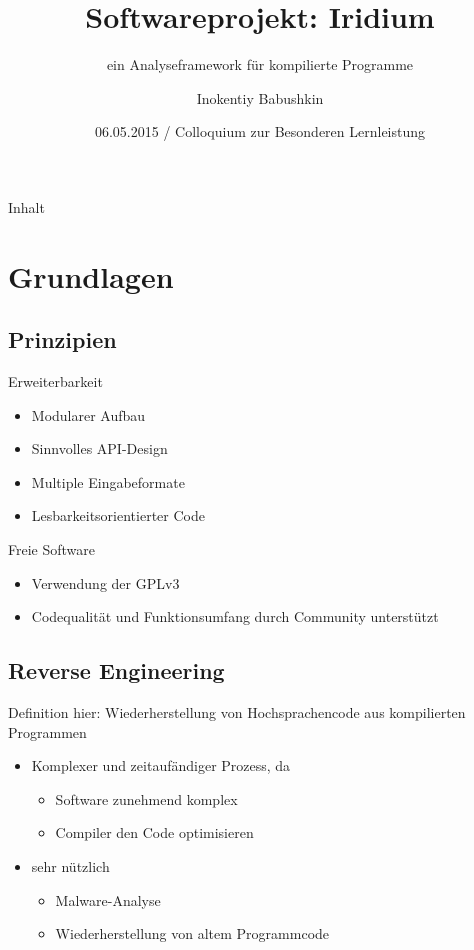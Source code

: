 \documentclass{beamer}
\title{Softwareprojekt: Iridium}
\subtitle{ein Analyseframework für kompilierte Programme}
\author{Inokentiy Babushkin}
\institute{Abteigymnasium Brauweiler}
\date{06.05.2015 / Colloquium zur Besonderen Lernleistung}
\begin{document}
\begin{frame}
  \titlepage
\end{frame}

\begin{frame}{Inhalt}
  \tableofcontents
\end{frame}

\section{Grundlagen}

\subsection{Prinzipien}

\begin{frame}{Erweiterbarkeit}
  \begin{itemize}
  \item Modularer Aufbau
  \item Sinnvolles API-Design
  \item Multiple Eingabeformate
  \item Lesbarkeitsorientierter Code
  \end{itemize}
\end{frame}

\begin{frame}{Freie Software}
  \begin{itemize}
  \item Verwendung der GPLv3
  \item Codequalität und Funktionsumfang durch Community unterstützt
  \end{itemize}
\end{frame}

\subsection{Reverse Engineering}

\begin{frame}{Definition hier: Wiederherstellung von Hochsprachencode aus kompilierten Programmen}
  \begin{itemize}
  \item Komplexer und zeitaufändiger Prozess, da
    \begin{itemize}
    \item Software zunehmend komplex
    \item Compiler den Code optimisieren
    \end{itemize}
  \item sehr nützlich
    \begin{itemize}
    \item Malware-Analyse
    \item Wiederherstellung von altem Programmcode
    \end{itemize}
  \end{itemize}
\end{frame}
\end{document}
